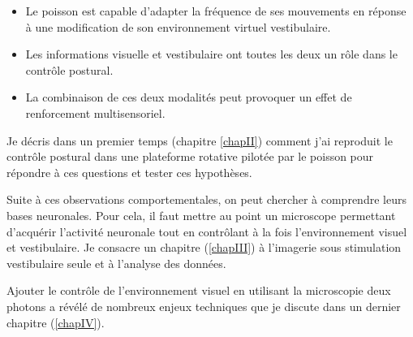 \begin{itemize}
  \item Le poisson est capable d'adapter la fréquence de ses mouvements en réponse à une modification de son environnement virtuel vestibulaire.
  \item Les informations visuelle et vestibulaire ont toutes les deux un rôle dans le contrôle postural.
  \item La combinaison de ces deux modalités peut provoquer un effet de renforcement multisensoriel.
\end{itemize}

Je décris dans un premier temps (chapitre \ref{chapII}) comment j'ai reproduit le contrôle postural dans une plateforme rotative pilotée par le poisson pour répondre à ces questions et tester ces hypothèses.

Suite à ces observations comportementales, on peut chercher à comprendre leurs bases neuronales. Pour cela, il faut mettre au point un microscope permettant d'acquérir l'activité neuronale tout en contrôlant à la fois l'environnement visuel et vestibulaire. Je consacre un chapitre (\ref{chapIII}) à l'imagerie sous stimulation vestibulaire seule et à l'analyse des données.

Ajouter le contrôle de l'environnement visuel en utilisant la microscopie deux photons a révélé de nombreux enjeux techniques que je discute dans un dernier chapitre (\ref{chapIV}).
